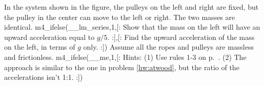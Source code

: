  In the system shown in the figure, the pulleys on the
left and right are fixed, but the pulley in the center can
move to the left or right. The two masses are identical.
m4_ifelse(__lm_series,1,[:%
Show that the mass on the left will have an upward
acceleration equal to $g/5$.
:],[:%
Find the upward acceleration of the mass on the left, in terms of $g$
only.
:]) Assume all the ropes and
pulleys are massless and frictionless.
m4_ifelse(__me,1,[:%
Hints: (1) Use rules 1-3 on p.~\pageref{pulley-rules}.
(2) The approach is similar to the one in problem \ref{hw:atwood},
but the ratio of the accelerations isn't 1:1.\answercheck
:])

